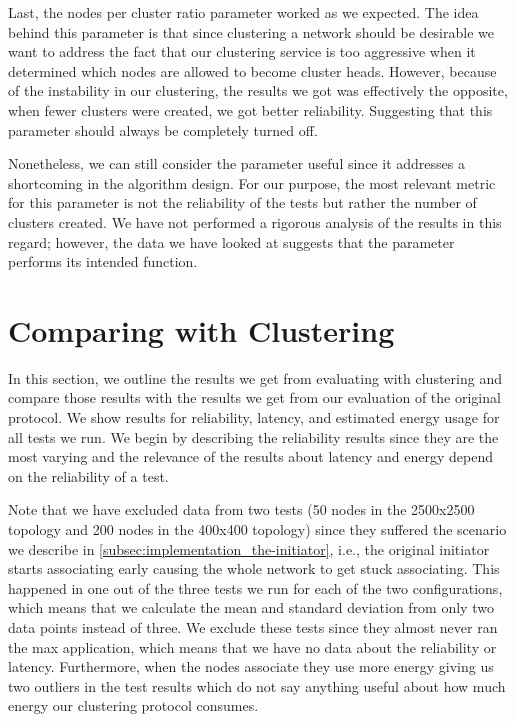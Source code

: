 Last, the nodes per cluster ratio parameter worked as we expected. The idea behind this parameter is that since clustering a network should be desirable we want to address the fact that our clustering service is too aggressive when it determined which nodes are allowed to become cluster heads. However, because of the instability in our clustering, the results we got was effectively the opposite, when fewer clusters were created, we got better reliability. Suggesting that this parameter should always be completely turned off.

Nonetheless, we can still consider the parameter useful since it addresses a shortcoming in the algorithm design. For our purpose, the most relevant metric for this parameter is not the reliability of the tests but rather the number of clusters created. We have not performed a rigorous analysis of the results in this regard; however, the data we have looked at suggests that the parameter performs its intended function.



\section{Comparing \atwo{} with Clustering}
In this section, we outline the results we get from evaluating \atwo{} with clustering and compare those results with the results we get from our evaluation of the original \atwo{} protocol. We show results for reliability, latency, and estimated energy usage for all tests we run. We begin by describing the reliability results since they are the most varying and the relevance of the results about latency and energy depend on the reliability of a test.

Note that we have excluded data from two tests (50 nodes in the 2500x2500 topology and 200 nodes in the 400x400 topology) since they suffered the scenario we describe in \cref{subsec:implementation_the-initiator}, i.e., the original initiator starts associating early causing the whole network to get stuck associating. This happened in one out of the three tests we run for each of the two configurations, which means that we calculate the mean and standard deviation from only two data points instead of three. We exclude these tests since they almost never ran the max application, which means that we have no data about the reliability or latency. Furthermore, when the nodes associate they use more energy giving us two outliers in the test results which do not say anything useful about how much energy our clustering protocol consumes.

